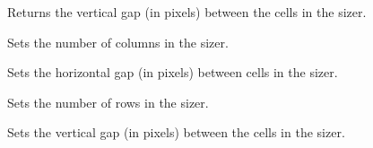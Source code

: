 Returns the vertical gap (in pixels) between the cells in the sizer.


\label{wxgridsizersetcols}


Sets the number of columns in the sizer.


\label{wxgridsizersethgap}


Sets the horizontal gap (in pixels) between cells in the sizer.


\label{wxgridsizersetrows}


Sets the number of rows in the sizer.


\label{wxgridsizersetvgap}


Sets the vertical gap (in pixels) between the cells in the sizer.




